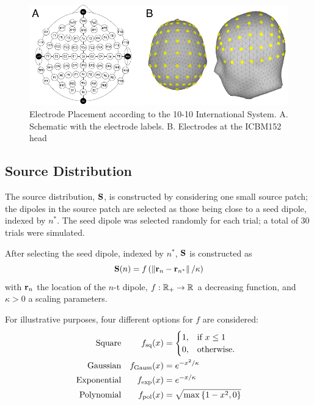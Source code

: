 \begin{figure}
\centering
\includegraphics{./img/EEG_10-10.pdf}
\caption{Electrode Placement according to the 10-10 International System. A. Schematic with the electrode labels. B. Electrodes at the ICBM152 head}
\label{fig:1010system}
\end{figure}


\subsection{Source Distribution}

The source distribution, $\mathbf{S}$, is constructed by considering one small source patch; the dipoles in the source patch are selected as those being close to a seed dipole, indexed by $n^*$.
%
The seed dipole was selected randomly for each trial; a total of 30 trials were simulated.

After selecting the seed dipole, indexed by $n^*$, $\mathbf{S}$ is constructed as
\begin{equation}
\mathbf{S}(n) = f\left(  \left\lVert \mathbf{r}_n-\mathbf{r}_{n^*} \right\rVert / \kappa  \right)
\end{equation}
with $\mathbf{r}_n$ the location of the $n$-t dipole, $f:\mathbb{R}_+\rightarrow \mathbb{R}$ a decreasing function, and $\kappa>0$ a scaling parameters.

For illustrative purposes, four different options for $f$ are considered:
\begin{align}
\text{Square} &&
    f_\text{sq}(x) 
    &= 
    \begin{cases}
1, &\text{if } x\leq 1 \\
0, &\text{otherwise}.
\end{cases}
    \\
\text{Gaussian} &&
    f_\text{Gauss}(x) 
    &= 
    e^{-x^2/\kappa}
    \\
\text{Exponential} &&
    f_\text{exp}(x) 
    &= 
    e^{-x/\kappa}
    \\
\text{Polynomial} &&
    f_\text{pol}(x) 
    &= 
    \sqrt{ \max \left\{ 1-{x}^2, 0  \right\}}
\end{align}

